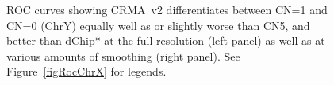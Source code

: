 \documentclass{bioinfo}
\begin{document}
\begin{figure}[!tpbh]
\begin{center}
\end{center}
 \caption{
   ROC curves showing CRMA~v2 differentiates between CN=1 and CN=0 (ChrY) equally well as or slightly worse than CN5, and better than dChip* at the full resolution (left panel) as well as at various amounts of smoothing (right panel).  
   See Figure~\ref{figRocChrX} for legends.
 }
 \label{figRocChrY}
\end{figure}
\end{document}
